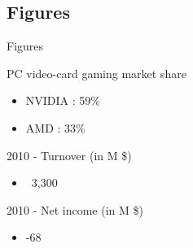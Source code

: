 \documentclass{beamer}
\begin{document}
\subsection{Figures}
\begin{frame}{Figures}
	\transdissolve[duration=0.1] %
	\begin{block}{PC video-card gaming market share}
		\begin{itemize}
			\item<+->{NVIDIA : 59\% }
			\item<+->{AMD : 33\% }
		\end{itemize}
	\end{block}	
	\begin{block}{2010 - Turnover (in M \$)}
		\begin{itemize}
			\item<+->{~3,300}
		\end{itemize}
	\end{block}
	\begin{block}{2010 - Net income (in M \$)}
		\begin{itemize}
			\item<+->{-68}
		\end{itemize}
	\end{block}
\end{frame}
\end{document}
